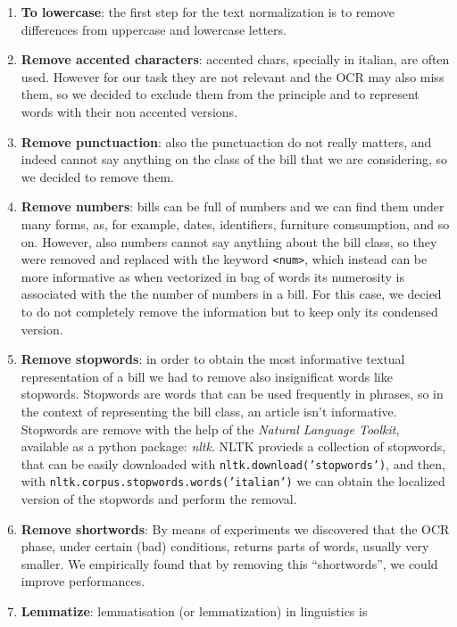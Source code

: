 \documentclass[10pt,twocolumn,letterpaper]{article}
\newcommand\codeinline[1]{\texttt{#1}}  %
\begin{document}
\begin{enumerate}
  \item \textbf{To lowercase}: the first step for the text normalization is to
    remove differences from uppercase and lowercase letters.
  \item \textbf{Remove accented characters}: accented chars, specially in
    italian, are often used. However for our task they are not relevant
    and the OCR may also miss them, so we decided to exclude them from
    the principle and to represent words with their non accented
    versions.
  \item \textbf{Remove punctuaction}: also the punctuaction do not really
    matters, and indeed cannot say anything on the class of the bill
    that we are considering, so we decided to remove them.
  \item \textbf{Remove numbers}: bills can be full of numbers and we
    can find them under many forms, as, for example, dates,
    identifiers, furniture comsumption, and so on. However, also
    numbers cannot say anything about the bill class, so they were
    removed and replaced with the keyword \codeinline{<num>}, which
    instead can be more informative as when vectorized in bag of words
    its numerosity is associated with the the number of numbers in a
    bill. For this case, we decied to do not completely remove the
    information but to keep only its condensed version.
  \item \textbf{Remove stopwords}: in order to obtain the most informative
    textual representation of a bill we had to remove also
    insignificat words like stopwords. Stopwords are words that can be
    used frequently in phrases, so in the context of representing the
    bill class, an article isn't informative. Stopwords are remove
    with the help of the \emph{Natural Language Toolkit}, available as
    a python package: \emph{nltk}. NLTK provieds a collection of
    stopwords, that can be easily downloaded with
    \codeinline{nltk.download('stopwords')}, and then, with
    \codeinline{nltk.corpus.stopwords.words('italian')} we can obtain the
    localized version of the stopwords and perform the removal.
  \item \textbf{Remove shortwords}: By means of experiments we discovered that
    the OCR phase, under certain (bad) conditions, returns parts of
    words, usually very smaller. We empirically found that by removing
    this ``shortwords'', we could improve performances.
  \item \textbf{Lemmatize}: lemmatisation (or lemmatization) in linguistics is

\end{enumerate}
\end{document}
